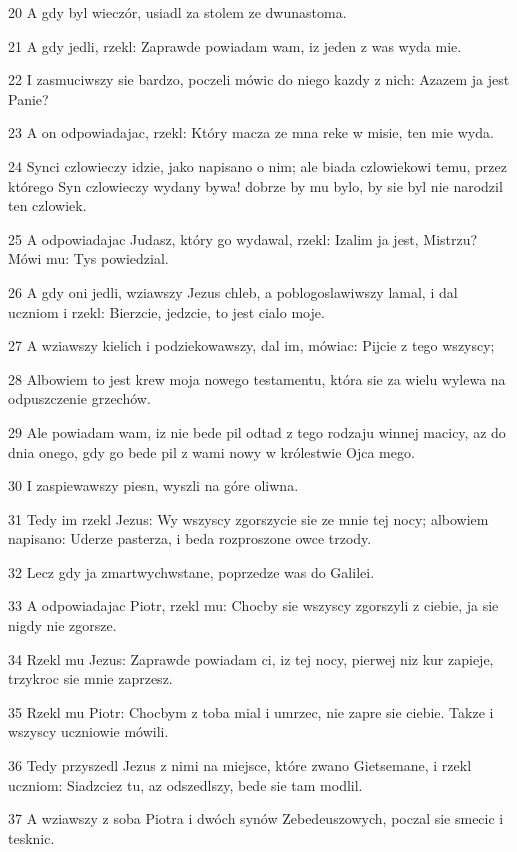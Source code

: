 \par 20 A gdy byl wieczór, usiadl za stolem ze dwunastoma.
\par 21 A gdy jedli, rzekl: Zaprawde powiadam wam, iz jeden z was wyda mie.
\par 22 I zasmuciwszy sie bardzo, poczeli mówic do niego kazdy z nich: Azazem ja jest Panie?
\par 23 A on odpowiadajac, rzekl: Który macza ze mna reke w misie, ten mie wyda.
\par 24 Synci czlowieczy idzie, jako napisano o nim; ale biada czlowiekowi temu, przez którego Syn czlowieczy wydany bywa! dobrze by mu bylo, by sie byl nie narodzil ten czlowiek.
\par 25 A odpowiadajac Judasz, który go wydawal, rzekl: Izalim ja jest, Mistrzu? Mówi mu: Tys powiedzial.
\par 26 A gdy oni jedli, wziawszy Jezus chleb, a poblogoslawiwszy lamal, i dal uczniom i rzekl: Bierzcie, jedzcie, to jest cialo moje.
\par 27 A wziawszy kielich i podziekowawszy, dal im, mówiac: Pijcie z tego wszyscy;
\par 28 Albowiem to jest krew moja nowego testamentu, która sie za wielu wylewa na odpuszczenie grzechów.
\par 29 Ale powiadam wam, iz nie bede pil odtad z tego rodzaju winnej macicy, az do dnia onego, gdy go bede pil z wami nowy w królestwie Ojca mego.
\par 30 I zaspiewawszy piesn, wyszli na góre oliwna.
\par 31 Tedy im rzekl Jezus: Wy wszyscy zgorszycie sie ze mnie tej nocy; albowiem napisano: Uderze pasterza, i beda rozproszone owce trzody.
\par 32 Lecz gdy ja zmartwychwstane, poprzedze was do Galilei.
\par 33 A odpowiadajac Piotr, rzekl mu: Chocby sie wszyscy zgorszyli z ciebie, ja sie nigdy nie zgorsze.
\par 34 Rzekl mu Jezus: Zaprawde powiadam ci, iz tej nocy, pierwej niz kur zapieje, trzykroc sie mnie zaprzesz.
\par 35 Rzekl mu Piotr: Chocbym z toba mial i umrzec, nie zapre sie ciebie. Takze i wszyscy uczniowie mówili.
\par 36 Tedy przyszedl Jezus z nimi na miejsce, które zwano Gietsemane, i rzekl uczniom: Siadzciez tu, az odszedlszy, bede sie tam modlil.
\par 37 A wziawszy z soba Piotra i dwóch synów Zebedeuszowych, poczal sie smecic i tesknic.
